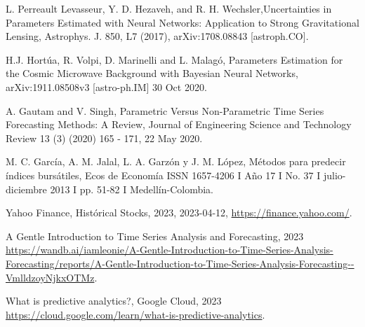 \documentclass[twoside]{article}
\theoremstyle{definition}
\theoremstyle{example}
\theoremstyle{remark}
\numberwithin{equation}{section}%
\begin{document}
\begin{thebibliography}{99}
 L. Perreault Levasseur, Y. D. Hezaveh, and R. H. Wechsler,Uncertainties in Parameters Estimated with Neural Networks: Application to Strong Gravitational Lensing, Astrophys. J. 850, L7 (2017), arXiv:1708.08843 [astroph.CO].

 H.J. Hortúa, R. Volpi, D. Marinelli and L. Malagó,
Parameters Estimation for the Cosmic Microwave Background with Bayesian Neural Networks, arXiv:1911.08508v3 [astro-ph.IM] 30 Oct 2020.

 A. Gautam and V. Singh, Parametric Versus Non-Parametric Time Series Forecasting Methods: A Review, Journal of Engineering Science and Technology Review 13 (3) (2020) 165 - 171, 22 May 2020.

 M. C. García, A. M. Jalal, L. A. Garzón y J. M. López, Métodos para predecir índices bursátiles, Ecos de Economía ISSN 1657-4206 I Año 17 I No. 37 I julio-diciembre 2013 I pp. 51-82 I Medellín-Colombia.


 Yahoo Finance, Histórical Stocks, 2023, 2023-04-12, \url{https://finance.yahoo.com/}.


 A Gentle Introduction to Time Series Analysis and Forecasting, 2023
\url{https://wandb.ai/iamleonie/A-Gentle-Introduction-to-Time-Series-Analysis-Forecasting/reports/A-Gentle-Introduction-to-Time-Series-Analysis-Forecasting--VmlldzoyNjkxOTMz}.

 What is predictive analytics?, Google Cloud, 2023
\url{https://cloud.google.com/learn/what-is-predictive-analytics}.

\end{thebibliography}

\label{end-art}
\end{document}
